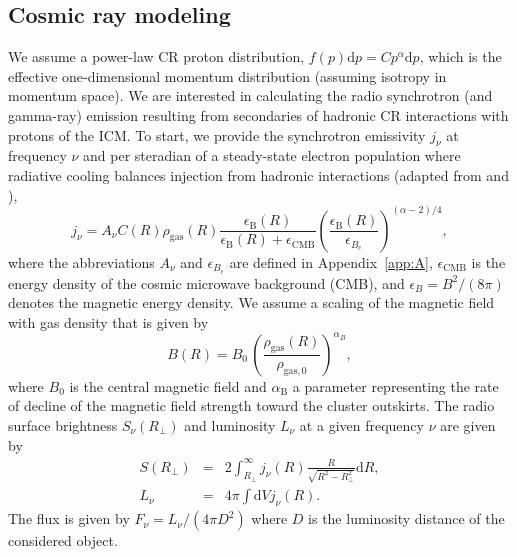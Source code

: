 \documentclass[traditabstract]{aa}
\newcommand{\rmn}{\mathrm}
\newcommand{\dd}{\mathrm{d}}
\begin{document}
\subsection{Cosmic ray modeling}
\label{sec:2.3}
We assume a power-law CR proton distribution, $f(p) \dd p=C p^\alpha \dd p$,
which is the effective one-dimensional momentum distribution (assuming isotropy
in momentum space). We are interested in calculating the radio synchrotron (and
gamma-ray) emission resulting from secondaries of hadronic CR interactions with
protons of the ICM. To start, we provide the synchrotron emissivity $j_{\nu}$ at
frequency $\nu$ and per steradian of a steady-state electron population where
radiative cooling balances injection from hadronic interactions (adapted from
\citealp{2008MNRAS.385.1211P} and \citealp{2011A&A...527A..99E}),
\begin{equation}
j_{\nu}  =  A_\nu C(R) \rho_{\rmn{gas}}(R) 
\frac{\epsilon_{\rmn{B}}(R)}{\epsilon_{\rmn{B}}(R)+\epsilon_{\rmn{CMB}}} 
\left( \frac{\epsilon_{\rmn{B}}(R)}{\epsilon_{B_{\rmn{c}}}} \right)^{(\alpha-2)/4},
\label{eq:jnu}
\end{equation}
where the abbreviations $A_\nu$ and $\epsilon_{B_{\rmn{c}}}$ are defined in
Appendix~\ref{app:A}, $\epsilon_{\rmn{CMB}}$ is the energy density of the cosmic
microwave background (CMB), and $\epsilon_B=B^{2}/(8\pi)$ denotes the magnetic
energy density. We assume a scaling of the magnetic field with gas density that
is given by
\begin{equation}
B(R) = B_0\,\left(\frac{\rho_{\rmn{gas}}(R)}{\rho_{\rmn{gas},0}}\right)^{\alpha_B},
\label{eq:B}
\end{equation}
where $B_0$ is the central magnetic field and $\alpha_{\rmn{B}}$ a parameter
representing the rate of decline of the magnetic field strength toward the
cluster outskirts. The radio surface brightness $S_{\nu}(R_{\perp})$ and luminosity
$L_{\nu}$ at a given frequency $\nu$ are given by
\begin{eqnarray}
S(R_{\perp}) &=& 2 \int_{R_{\perp}}^{\infty} j_{\nu}(R) \frac{R}{\sqrt{R^{2}-R_{\perp}^{2}}} \rmn{d}R, \label{eq:surf} \\
L_{\nu}  &=&  4 \pi \int \dd V j_\nu(R).
\label{eq:lum}
\end{eqnarray}
The flux is given by $F_{\nu}=L_{\nu}/(4\pi D^{2})$ where $D$ is the
luminosity distance of the considered object.
\end{document}
